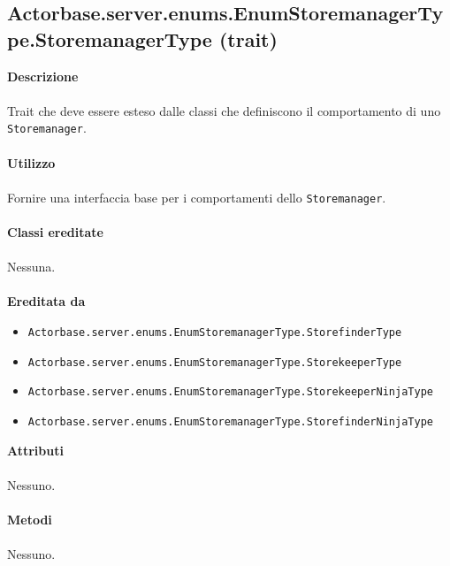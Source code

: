 \documentclass[a4paper]{article}
\begin{document}
				\subsection{Actorbase.server.enums.EnumStoremanagerType.StoremanagerType (trait)}
		\textbf{Descrizione}
			\\ \\
			Trait che deve essere esteso dalle classi che definiscono il comportamento di uno \texttt{Storemanager}.
			\\ \\
		\textbf{Utilizzo}
			\\ \\
			Fornire una interfaccia base per i comportamenti dello \texttt{Storemanager}.
			\\ \\
		\textbf{Classi ereditate}
		\\ \\
		Nessuna.
		\\ \\
		\textbf{Ereditata da}
			\begin{itemize}
				\item \texttt{Actorbase.server.enums.EnumStoremanagerType.StorefinderType}
				\item \texttt{Actorbase.server.enums.EnumStoremanagerType.StorekeeperType}
				\item \texttt{Actorbase.server.enums.EnumStoremanagerType.StorekeeperNinjaType}
				\item \texttt{Actorbase.server.enums.EnumStoremanagerType.StorefinderNinjaType}
			\end{itemize}
		\textbf{Attributi}
		\\ \\
			Nessuno.
			\\ \\
		\textbf{Metodi}
			\\ \\
			Nessuno.
			
\end{document}
